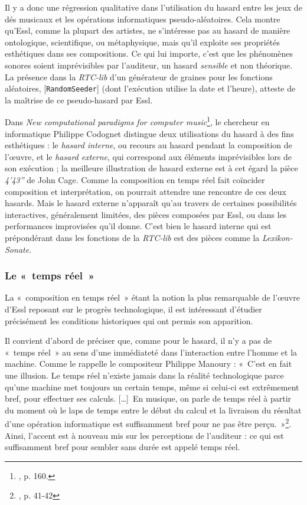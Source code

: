\documentclass[a4paper,12pt]{article}
\newcommand{\guill}[1]{«~#1~»}
\newcommand{\tpp}[0]{[\dots]}
\newcommand{\patch}[1]{[\texttt{#1}]}
\begin{document}
Il y a donc une régression qualitative dans l'utilisation du hasard entre les jeux de dés musicaux et les opérations informatiques pseudo-aléatoires. Cela montre qu'Essl, comme la plupart des artistes, ne s'intéresse pas au hasard de manière ontologique, scientifique, ou métaphysique, mais qu'il exploite ses propriétés esthétiques dans ses compositions. Ce qui lui importe, c'est que les phénomènes sonores soient imprévisibles par l'auditeur, un hasard \emph{sensible} et non théorique. La présence dans la \emph{RTC-lib} d'un générateur de graines pour les fonctions aléatoires, \patch{RandomSeeder} (dont l'exécution utilise la date et l'heure), atteste de la maîtrise de ce pseudo-hasard par Essl.

Dans \emph{New computational paradigms for computer music}\footnote{\cite{assayag2009new}, p. 160.}, le chercheur en informatique Philippe Codognet distingue deux utilisations du hasard à des fins esthétiques : le \emph{hasard interne}, ou recours au hasard pendant la composition de l'œuvre, et le \emph{hasard externe}, qui correspond aux éléments imprévisibles lors de son exécution ; la meilleure illustration de hasard externe est à cet égard la pièce \emph{4'43''} de John Cage. Comme la composition en temps réel fait coïncider composition et interprétation, on pourrait attendre une rencontre de ces deux hasards. Mais le hasard externe n'apparaît qu'au travers de certaines possibilités interactives, généralement limitées, des pièces composées par Essl, ou dans les performances improvisées qu'il donne. C'est bien le hasard interne qui est prépondérant dans les fonctions de la \emph{RTC-lib} est des pièces comme la \emph{Lexikon-Sonate}.

\subsubsection{Le \guill{temps réel}}
\label{tempsreel}

La \guill{composition en temps réel} étant la notion la plus remarquable de l'œuvre d'Essl reposant sur le progrès technologique, il est intéressant d'étudier précisément les conditions historiques qui ont permis son apparition.

Il convient d'abord de préciser que, comme pour le hasard, il n'y a pas de \guill{temps réel} au sens d'une immédiateté dans l'interaction entre l'homme et la machine. Comme le rappelle le compositeur Philippe Manoury : \guill{C'est en fait une illusion. Le temps réel n'existe jamais dans la réalité technologique parce qu'une machine met toujours un certain temps, même si celui-ci est extrêmement bref, pour effectuer ses calculs. \tpp~En musique, on parle de temps réel à partir du moment où le laps de temps entre le début du calcul et la livraison du résultat d'une opération informatique est suffisamment bref pour ne pas être perçu.}\footnote{\cite{manoury2012musique}, p. 41-42}. Ainsi, l'accent est à nouveau mis sur les perceptions de l'auditeur : ce qui est suffisamment bref pour sembler sans durée est appelé temps réel.
\end{document}
